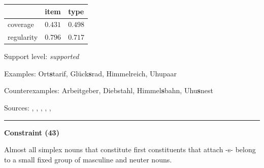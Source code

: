 \vspace{-0.25em}

\begin{table}[!ht]
\begin{center}
\setlength{\extrarowheight}{1pt}
\begin{tabularx}{\columnwidth}{|X|X|X|}
\hline
 & item & type \\
\hline
 coverage & $0.431$ & $0.498$ \\
\hline
 regularity & $0.796$ & $0.717$ \\
\hline
\end{tabularx}
\end{center}
\end{table}

\vspace{-1.35em}

\noindent
Support level: \textit{supported}

\vspace{0.3em}

\noindent
Examples: Ort\textbf{s}tarif, Glück\textbf{s}rad, Himmel{\zeroLinker}reich, Uhu{\zeroLinker}paar

\noindent
Counterexamples: Arbeit{\zeroLinker}geber, Dieb{\zeroLinker}stahl, Himmel\textbf{s}bahn, Uhu\textbf{s}nest

\vspace{0.3em}

\noindent
Sources: \citet[572]{fuhrhop_kuerschner_2015}, \citet[110]{kuerschner_2005}, \citet[7, 17]{nuebling_szczepaniak_2008}, \citet[9]{schaefer_pankratz_2018}, \citet[434]{wegener_2003}, \citet[180, 181, 182]{wegener_2005}

\vspace{0.35em}
\hrule




\vspace{0.4em}

\begin{center}
\textbf{Constraint (43)}
\end{center}

\noindent
Almost all simplex nouns that constitute first constituents that attach -s- belong to a small fixed group of masculine and neuter nouns.
\vspace{0.5em}


